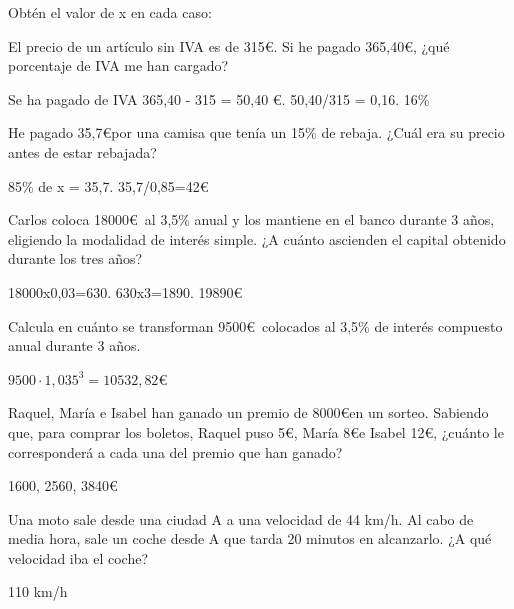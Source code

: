 \documentclass[addpoints,spanish, 12pt,a4paper]{exam}
\begin{document}
\begin{questions}

\question Obtén el valor de x en cada caso:
\addpoints


\question [2] El precio de un artículo sin IVA es de 315\euro. Si he pagado 365,40\euro, ¿qué porcentaje de IVA me han cargado?
\begin{solution}
Se ha pagado de IVA 365,40 - 315 = 50,40 \euro. 50,40/315 = 0,16. 16\%
\end{solution}

\question [2] He pagado 35,7\euro por una camisa que tenía un 15\% de rebaja. ¿Cuál era su precio antes de estar rebajada?
\begin{solution}
85\% de x = 35,7. 35,7/0,85=42\euro
\end{solution}

\question [2] Carlos coloca 18000\euro \   al 3,5\% anual y los mantiene en el banco durante 3 años, eligiendo la modalidad de interés simple. ¿A cuánto ascienden el capital obtenido durante los tres años?
\begin{solution}
18000x0,03=630. 630x3=1890. 19890\euro
\end{solution}


\question [2] Calcula en cuánto se transforman 9500\euro \ colocados al 3,5\% de interés compuesto anual durante 3 años.
\begin{solution}
$9500\cdot1,035^3=10532,82$\euro
\end{solution}

\question [2] Raquel, María e Isabel han ganado un premio de 8000\euro en un sorteo. Sabiendo que, para comprar los boletos, Raquel puso 5\euro, María 8\euro e Isabel 12\euro, ¿cuánto le corresponderá a cada una del premio que han ganado?
\begin{solution}
1600, 2560, 3840\euro
\end{solution}

\question [3] Una moto sale desde una ciudad A a una velocidad de 44 km/h. Al cabo de media hora, sale un coche desde A que tarda 20 minutos en alcanzarlo. ¿A qué velocidad iba el coche?
\begin{solution}
110 km/h
\end{solution}


\addpoints

\end{questions}
\end{document}
